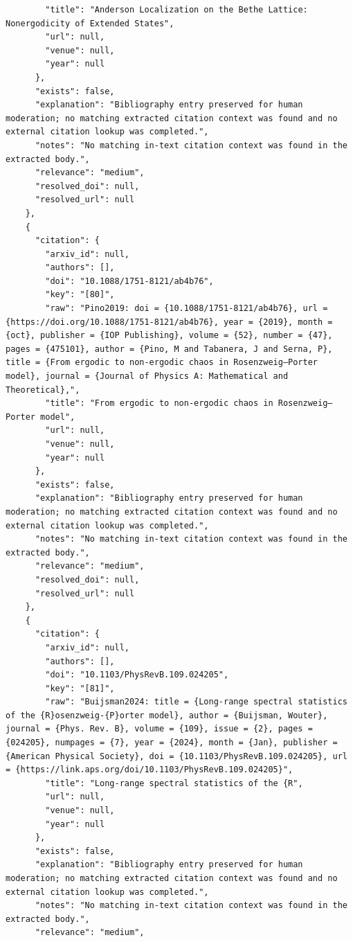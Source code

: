 \documentclass[11pt]{article}
\begin{document}
\begin{verbatim}
        "title": "Anderson Localization on the Bethe Lattice: Nonergodicity of Extended States",
        "url": null,
        "venue": null,
        "year": null
      },
      "exists": false,
      "explanation": "Bibliography entry preserved for human moderation; no matching extracted citation context was found and no external citation lookup was completed.",
      "notes": "No matching in-text citation context was found in the extracted body.",
      "relevance": "medium",
      "resolved_doi": null,
      "resolved_url": null
    },
    {
      "citation": {
        "arxiv_id": null,
        "authors": [],
        "doi": "10.1088/1751-8121/ab4b76",
        "key": "[80]",
        "raw": "Pino2019: doi = {10.1088/1751-8121/ab4b76}, url = {https://doi.org/10.1088/1751-8121/ab4b76}, year = {2019}, month = {oct}, publisher = {IOP Publishing}, volume = {52}, number = {47}, pages = {475101}, author = {Pino, M and Tabanera, J and Serna, P}, title = {From ergodic to non-ergodic chaos in Rosenzweig–Porter model}, journal = {Journal of Physics A: Mathematical and Theoretical},",
        "title": "From ergodic to non-ergodic chaos in Rosenzweig–Porter model",
        "url": null,
        "venue": null,
        "year": null
      },
      "exists": false,
      "explanation": "Bibliography entry preserved for human moderation; no matching extracted citation context was found and no external citation lookup was completed.",
      "notes": "No matching in-text citation context was found in the extracted body.",
      "relevance": "medium",
      "resolved_doi": null,
      "resolved_url": null
    },
    {
      "citation": {
        "arxiv_id": null,
        "authors": [],
        "doi": "10.1103/PhysRevB.109.024205",
        "key": "[81]",
        "raw": "Buijsman2024: title = {Long-range spectral statistics of the {R}osenzweig-{P}orter model}, author = {Buijsman, Wouter}, journal = {Phys. Rev. B}, volume = {109}, issue = {2}, pages = {024205}, numpages = {7}, year = {2024}, month = {Jan}, publisher = {American Physical Society}, doi = {10.1103/PhysRevB.109.024205}, url = {https://link.aps.org/doi/10.1103/PhysRevB.109.024205}",
        "title": "Long-range spectral statistics of the {R",
        "url": null,
        "venue": null,
        "year": null
      },
      "exists": false,
      "explanation": "Bibliography entry preserved for human moderation; no matching extracted citation context was found and no external citation lookup was completed.",
      "notes": "No matching in-text citation context was found in the extracted body.",
      "relevance": "medium",

\end{verbatim}
\end{document}
